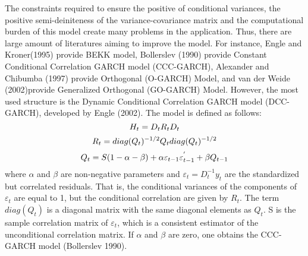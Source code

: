 \documentclass[a4paper,12pt]{article}
\begin{document}
\noindent The constraints required to ensure the positive of conditional variances, the positive semi-deiniteness of the variance-covariance matrix and the computational burden of this model create many problems in the application. Thus, there are large amount of literatures aiming to improve the model. For instance, Engle and Kroner(1995) provide BEKK model, Bollerslev (1990) provide Constant Conditional Correlation GARCH model (CCC-GARCH), Alexander and Chibumba (1997) provide Orthogonal (O-GARCH) Model, and van der Weide (2002)provide  Generalized Orthogonal (GO-GARCH) Model. However, the most used structure is the Dynamic Conditional Correlation GARCH model (DCC-GARCH), developed by Engle (2002). The model is defined as follows:
\begin{equation}
\centering
H_t = D_tR_tD_t
\end{equation}
\begin{equation}
\centering
R_t = diag (Q_t)^{-1/2}Q_tdiag (Q_t)^{-1/2}
\end{equation}
\begin{equation}\label{DCCQ}
\centering
Q_t = S(1 - \alpha- \beta) + \alpha\varepsilon_{t-1}\varepsilon_{t-1}^{'} + \beta Q_{t-1}
\end{equation}
where $\alpha$ and $\beta$ are non-negative parameters and $\varepsilon_t = D_t^{-1}y_t$ are the standardized but correlated residuals. That is, the conditional variances of the components of $\varepsilon_t$ are equal to 1, but the conditional correlation are given by $R_t$. The term $diag(Q_t)$ is a diagonal matrix with the same diagonal elements as $Q_t$. S is the sample correlation matrix of $\varepsilon_t$, which is a consistent estimator of the unconditional correlation matrix. If $\alpha$ and $\beta$ are zero, one obtains the CCC-GARCH model (Bollerslev 1990).\\
\end{document}
